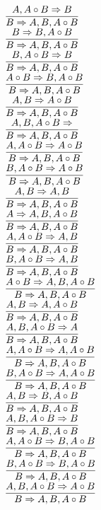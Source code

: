 \documentclass[11pt]{article}
\begin{document}
\begin{center}
\bigskip
\\$\infer{B\Rightarrow A, B, A\circ B}{A, A\circ B\Rightarrow B}$
\bigskip
\\$\infer{B\Rightarrow A, B, A\circ B}{B\Rightarrow B, A\circ B}$
\bigskip
\\$\infer{B\Rightarrow A, B, A\circ B}{B, A\circ B\Rightarrow B}$
\bigskip
\\$\infer{B\Rightarrow A, B, A\circ B}{A\circ B\Rightarrow B, A\circ B}$
\bigskip
\\$\infer{B\Rightarrow A, B, A\circ B}{A, B\Rightarrow A\circ B}$
\bigskip
\\$\infer{B\Rightarrow A, B, A\circ B}{A, B, A\circ B\Rightarrow }$
\bigskip
\\$\infer{B\Rightarrow A, B, A\circ B}{A, A\circ B\Rightarrow A\circ B}$
\bigskip
\\$\infer{B\Rightarrow A, B, A\circ B}{B, A\circ B\Rightarrow A\circ B}$
\bigskip
\\$\infer{B\Rightarrow A, B, A\circ B}{A, B\Rightarrow A, B}$
\bigskip
\\$\infer{B\Rightarrow A, B, A\circ B}{A\Rightarrow A, B, A\circ B}$
\bigskip
\\$\infer{B\Rightarrow A, B, A\circ B}{A, A\circ B\Rightarrow A, B}$
\bigskip
\\$\infer{B\Rightarrow A, B, A\circ B}{B, A\circ B\Rightarrow A, B}$
\bigskip
\\$\infer{B\Rightarrow A, B, A\circ B}{A\circ B\Rightarrow A, B, A\circ B}$
\bigskip
\\$\infer{B\Rightarrow A, B, A\circ B}{A, B\Rightarrow A, A\circ B}$
\bigskip
\\$\infer{B\Rightarrow A, B, A\circ B}{A, B, A\circ B\Rightarrow A}$
\bigskip
\\$\infer{B\Rightarrow A, B, A\circ B}{A, A\circ B\Rightarrow A, A\circ B}$
\bigskip
\\$\infer{B\Rightarrow A, B, A\circ B}{B, A\circ B\Rightarrow A, A\circ B}$
\bigskip
\\$\infer{B\Rightarrow A, B, A\circ B}{A, B\Rightarrow B, A\circ B}$
\bigskip
\\$\infer{B\Rightarrow A, B, A\circ B}{A, B, A\circ B\Rightarrow B}$
\bigskip
\\$\infer{B\Rightarrow A, B, A\circ B}{A, A\circ B\Rightarrow B, A\circ B}$
\bigskip
\\$\infer{B\Rightarrow A, B, A\circ B}{B, A\circ B\Rightarrow B, A\circ B}$
\bigskip
\\$\infer{B\Rightarrow A, B, A\circ B}{A, B, A\circ B\Rightarrow A\circ B}$

\end{center}
\end{document}
